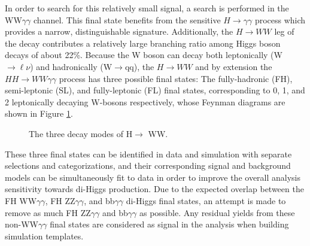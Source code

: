 In order to search for this relatively small signal, a search is performed in the WW$\gamma\gamma$ channel. 
This final state benefits from the sensitive $H\rightarrow\gamma\gamma$ process which provides a narrow, distinguishable signature. Additionally, the
$H\rightarrow WW$ leg of the decay contributes a relatively large branching ratio among Higgs boson decays of about 22\%. 
Because the W boson can decay both leptonically (W$\rightarrow\ell\nu$) and hadronically (W$\rightarrow$qq), the $H\rightarrow WW$ and by extension the $HH\rightarrow WW\gamma\gamma$ process has three possible final states:
The fully-hadronic (FH), semi-leptonic (SL), and fully-leptonic (FL) final states, corresponding to 0, 1, and 2 leptonically decaying W-bosons respectively, whose Feynman diagrams are shown in Figure \ref{fig:HHWWgg_FD_finalStates}. 

\begin{figure}[H]%
    \setcounter{subfigure}{0} %
    \centering
    \qquad
    \qquad
    \qquad
    \caption{The three decay modes of H$\rightarrow$ WW. \label{fig:HHWWgg_FD_finalStates}}%
\end{figure} 

These three final states can be identified in data and simulation
with separate selections and categorizations, and their corresponding
signal and background models can be simultaneously fit to data in order to improve the overall analysis sensitivity towards di-Higgs production. Due to the expected overlap between the FH WW$\gamma\gamma$, FH ZZ$\gamma\gamma$, and bb$\gamma\gamma$ di-Higgs
final states, an attempt is made to remove as much FH ZZ$\gamma\gamma$ and bb$\gamma\gamma$ as possible. Any residual yields from these non-WW$\gamma\gamma$ final states are considered as signal in the analysis when building simulation templates. 

